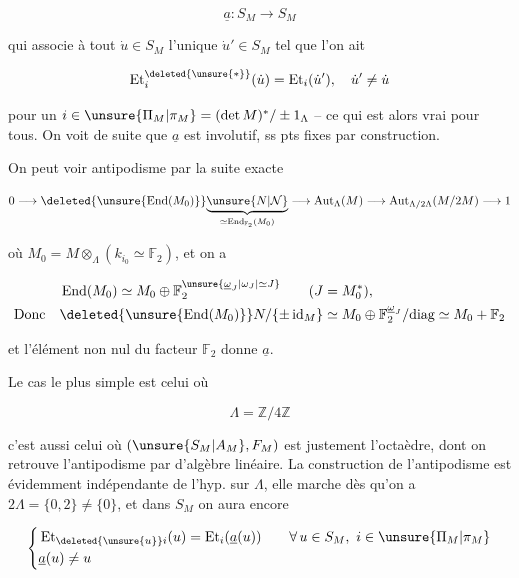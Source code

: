 \[
\underline a:S_M\longrightarrow S_M
\]

qui associe à tout $\dot u\in S_M$ l'unique $\dot u'\in S_M$ tel que l'on ait

\[
\operatorname{Et}^{\deleted{\unsure{*}}}_{i}(\dot u)=\operatorname{Et}_i(\dot u'),\quad \dot u'\ne\dot u
\]

pour un $i\in\unsure{\Pi_M|\pi_M}=(\det M)^*/\pm1_\Lambda$ -- ce qui est alors vrai pour tous. On voit de suite que $\underline a$ est involutif,  ss pts fixes par construction.

On peut voir  antipodisme par la suite exacte

\[
0\longrightarrow\deleted{\unsure{\operatorname{End}(M_0)}}\underset{\simeq\operatorname{End}_{\mathbb F_2}(M_0)}{\underbrace{\unsure{N|\mathcal N}}}\longrightarrow\operatorname{Aut}_\Lambda(M)\longrightarrow\operatorname{Aut}_{\Lambda/2\Lambda}(M/2M)\longrightarrow1
\]

où $M_0=M\otimes_\Lambda(k_{i_0}\simeq\mathbb F_2)$, et on a

\[
\begin{aligned}
&\operatorname{End}(M_0)\simeq M_0\oplus\mathbb F_2^{\unsure{\underline\omega_J|\omega_J|\simeq J}}\qquad(J=M_0^*),\\
\text{Donc}\quad&\deleted{\unsure{\operatorname{End}(M_0)}}N/\{\pm\operatorname{id}_M\}\simeq M_0\oplus\mathbb F_2^{\underline\omega_J}/\text{diag}\simeq M_0+\mathbb F_2
\end{aligned}
\]

et l'élément non nul du facteur $\mathbb F_2$ donne $\underline a$.


Le  cas le plus simple est celui où

\[
\Lambda=\mathbb Z/4\mathbb Z
\]

c'est aussi celui où $(\unsure{S_M|A_M},F_M)$ est justement l'octaèdre, dont on retrouve l'antipodisme par  d'algèbre linéaire. La construction  de l'antipodisme est évidemment indépendante de l'hyp.  sur $\Lambda$, elle marche dès qu'on a $2\Lambda=\{0,2\}\ne\{0\}$, et dans $S_M$ on aura encore

\[
\left\{\begin{aligned}
&\operatorname{Et}_{\deleted{\unsure{u}}i}(u)=\operatorname{Et}_i(\underline a(u))\qquad\forall\,u\in S_M,\ i\in\unsure{\Pi_M|\pi_M}\\
&\underline a(u)\ne u
\end{aligned}\right.
\]

